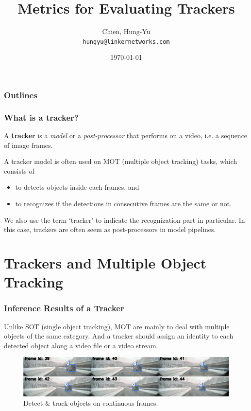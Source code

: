 \documentclass[slidetop, mathserif]{beamer}
\title[Metrics for Tracking]{Metrics for Evaluating Trackers}
\author[chy1010]{Chien, Hung-Yu \\ {\small\tt hungyu@linkernetworks.com}}
\date{\today}
\begin{document}
\begin{frame}
	\titlepage
\end{frame}

\section[Outline]{}
\begin{frame}
	\frametitle{Outlines}
	\tableofcontents
\end{frame}


\begin{frame}
	\frametitle{What is a tracker?}

	A {\bf tracker} is a \emph{model} or a \emph{post-processor}
	that performs on a video, i.e. a sequence of image frames.

	\quad

	A tracker model is often used on MOT (multiple object tracking) tasks,
	which consists of
	\begin{itemize}
	\item to detects objects inside each frames, and
	\item
		to recognizes if the detections in consecutive frames are the
		same or not.
	\end{itemize}

	\quad

	We also use the term `tracker' to indicate the recognization part
	in particular. In this case, trackers are often seem as post-processors
	in model pipelines.

\end{frame}


\section{Trackers and Multiple Object Tracking}

\begin{frame}
	\frametitle{Inference Results of a Tracker}

	Unlike SOT (single object tracking), MOT are mainly to deal with
	multiple objects of the same category. And a tracker should assign
	an identity to each detected object along a video file or a video
	stream.

	\begin{figure}
		\includegraphics[width=1.05\textwidth]{pics/track01.png}
		\caption{Detect \& track objects on continuous frames.}
	\end{figure}

\end{frame}
\end{document}
